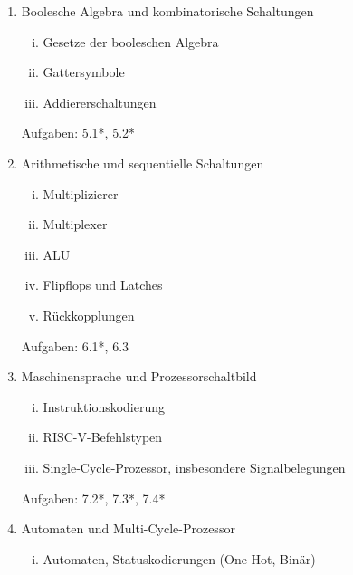 \documentclass{article}
\begin{document}
\begin{enumerate}
\begin{enumerate}[i.]
		      \item (End-)Rekursion
		      \item Stackframes
		      \item Mehrbenutzersysteme
		      \item Benutzermodus und Systemmodus\footnote{Mehr dazu kommt später
			            in Grundlagen Betriebssysteme und Systemsoftware (GBS), allerdings könnten
			            vereinzelnt Theoriefragen zu grundlegenden Inhalten gestellt werden}
		      \item Interrupts, Traps, Exceptions
		      \item virtuelle Speicherverwaltung
	      \end{enumerate}
	      Aufgaben: 4.1, 4.3, 4.4, eigene Problemstellungen ausdenken und in Assembly implementieren!
	\item Boolesche Algebra und kombinatorische Schaltungen
	      \begin{enumerate}[i.]
		      \item Gesetze der booleschen Algebra
		      \item Gattersymbole
		      \item Addiererschaltungen
	      \end{enumerate}
	      Aufgaben: 5.1*, 5.2*
	\item Arithmetische und sequentielle Schaltungen
	      \begin{enumerate}[i.]
		      \item Multiplizierer
		      \item Multiplexer
		      \item ALU
		      \item Flipflops und Latches
		      \item Rückkopplungen
	      \end{enumerate}
	      Aufgaben: 6.1*, 6.3
	\item Maschinensprache und Prozessorschaltbild
	      \begin{enumerate}[i.]
		      \item Instruktionskodierung
		      \item RISC-V-Befehlstypen
		      \item Single-Cycle-Prozessor, insbesondere Signalbelegungen
	      \end{enumerate}
	      Aufgaben: 7.2*, 7.3*, 7.4*
	\item Automaten und Multi-Cycle-Prozessor
	      \begin{enumerate}[i.]
		      \item Automaten, Statuskodierungen (One-Hot, Binär)

\end{enumerate}
\end{enumerate}
\end{document}
